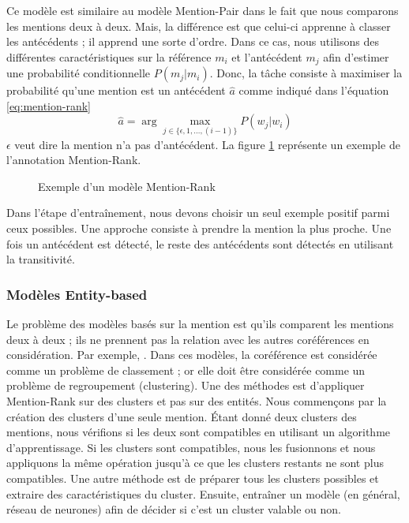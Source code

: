 \documentclass{KodeBook}
\begin{document}
Ce modèle est similaire au modèle Mention-Pair dans le fait que nous comparons les mentions deux à deux. 
Mais, la différence est que celui-ci apprenne à classer les antécédents ; il apprend une sorte d'ordre. 
Dans ce cas, nous utilisons des différentes caractéristiques sur la référence $m_i$ et l'antécédent $m_j$ afin d'estimer une probabilité conditionnelle $P(m_j|m_i)$.
Donc, la tâche consiste à maximiser la probabilité qu'une mention est un antécédent $\hat{a}$ comme indiqué dans l'équation \ref{eq:mention-rank}
\begin{equation}\label{eq:mention-rank}
\hat{a} = \arg\max_{j \in \{\epsilon, 1, \ldots, (i-1)\}} P(w_j|w_i) 
\end{equation}
$\epsilon$ veut dire la mention n'a pas d'antécédent. 
La figure \ref{fig:mention-rank-exp} représente un exemple de l'annotation Mention-Rank.

\begin{figure}[ht]
	\centering
	\caption[Exemple d'un modèle Mention-Rank]{Exemple d'un modèle Mention-Rank \cite{2019-jurafsky-martin}}
	\label{fig:mention-rank-exp}
\end{figure}

Dans l'étape d'entraînement, nous devons choisir un seul exemple positif parmi ceux possibles. 
Une approche consiste à prendre la mention la plus proche.
Une fois un antécédent est détecté, le reste des antécédents sont détectés en utilisant la transitivité. 

\subsubsection{Modèles Entity-based}

Le problème des modèles basés sur la mention est qu'ils comparent les mentions deux à deux ; ils ne prennent pas la relation avec les autres coréférences en considération.
Par exemple, .
Dans ces modèles, la coréférence est considérée comme un problème de classement ; or elle doit être considérée comme un problème de regroupement (clustering). 
Une des méthodes est d'appliquer Mention-Rank sur des clusters et pas sur des entités. 
Nous commençons par la création des clusters d'une seule mention. 
Étant donné deux clusters des mentions, nous vérifions si les deux sont compatibles en utilisant un algorithme d'apprentissage.
Si les clusters sont compatibles, nous les fusionnons et nous appliquons la même opération jusqu'à ce que les clusters restants ne sont plus compatibles.
Une autre méthode est de préparer tous les clusters possibles et extraire des caractéristiques du cluster.
Ensuite, entraîner un modèle (en général, réseau de neurones) afin de décider si c'est un cluster valable ou non.
\end{document}
